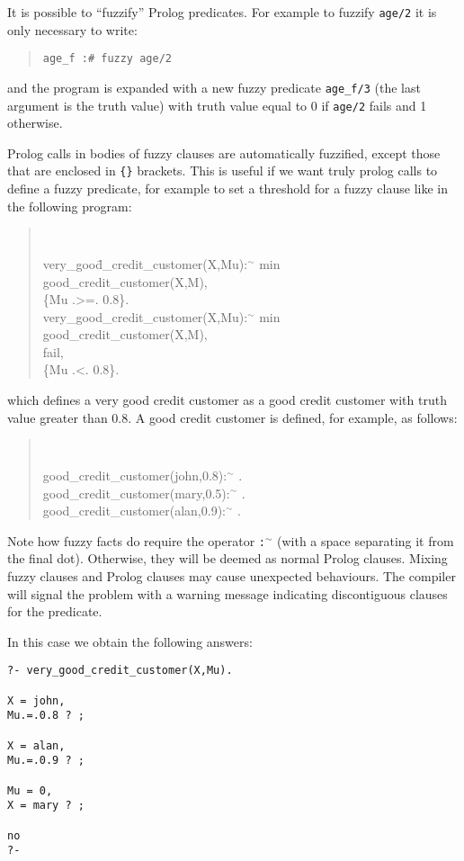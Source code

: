 It is possible to ``fuzzify'' Prolog predicates. For
example to fuzzify \verb+age/2+ it is only necessary to write:
\begin{quote}
\begin{verbatim}
age_f :# fuzzy age/2
\end{verbatim}
\end{quote}
%
and the program is expanded with a new fuzzy predicate
\texttt{age\_f/3} (the last argument is the truth value) with truth
value equal to 0 if \texttt{age/2} fails and 1 otherwise. 

Prolog calls
in bodies of fuzzy clauses are automatically fuzzified, except those
that are enclosed in \verb+{}+ brackets. This is useful if we want
truly prolog calls to define a fuzzy predicate, for example to set a
threshold for a fuzzy clause like in the following program:
\begin{quote}
{\tt
\begin{tabbing} 
very\_goo\=d\_credit\_customer(X,Mu):{\tiny$^\sim$} min \\
\>        good\_credit\_customer(X,M), \\
\>        \{Mu .>=. 0.8\}.  \\
very\_good\_credit\_customer(X,Mu):{\tiny$^\sim$} min \\
\>        good\_credit\_customer(X,M), \\
\>        fail, \\
\>        \{Mu .<. 0.8\}.
\end{tabbing}
}
\end{quote}
%
which defines a very good credit customer as a good credit customer
with truth value greater than $0.8$. A  good credit customer is
defined, for example, as follows:
\begin{quote}
{\tt
\begin{tabbing} 
good\_credit\_customer(john,0.8):{\tiny$^\sim$} . \\
good\_credit\_customer(mary,0.5):{\tiny$^\sim$} . \\
good\_credit\_customer(alan,0.9):{\tiny$^\sim$} . 
\end{tabbing}
}
\end{quote}

Note how fuzzy facts do require the operator \texttt{:{\tiny$^\sim$}}
(with a space separating it from the final dot). Otherwise, they will
be deemed as normal Prolog clauses. Mixing fuzzy clauses and Prolog
clauses may cause unexpected behaviours. The compiler will signal
the problem with a warning message indicating discontiguous clauses for
the predicate.

In this case we obtain the following answers: 

\begin{verbatim}
?- very_good_credit_customer(X,Mu).

X = john,
Mu.=.0.8 ? ;

X = alan,
Mu.=.0.9 ? ;

Mu = 0,
X = mary ? ;

no
?- 
\end{verbatim}
